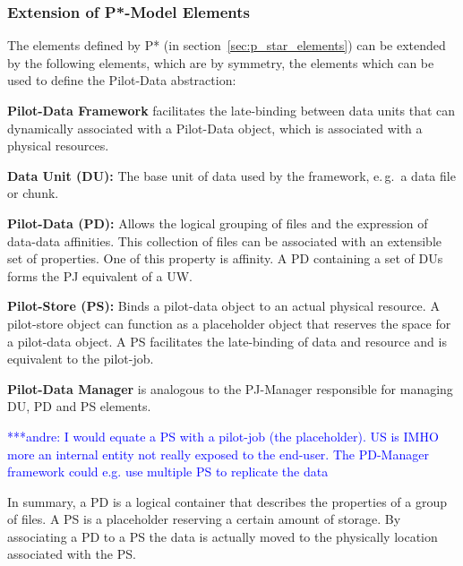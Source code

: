 \documentclass[conference,final]{IEEEtran}
\newcommand{\jhanote}[1]{ {\textcolor{red} { ***shantenu: #1 }}}
\newcommand{\alnote}[1]{ {\textcolor{blue} { ***andre: #1 }}}
\newcommand{\alnote}[1]{}
\newcommand{\jhanote}[1]{}
\begin{document}
\subsubsection*{Extension of P*-Model Elements}

The elements defined by P* (in section~\ref{sec:p_star_elements}) can be
extended by the following elements, which are by symmetry, the
elements which can be used to define the Pilot-Data abstraction:
\begin{compactenum}[A.]
\item \textbf{Pilot-Data Framework} facilitates the late-binding between data 
 units that can dynamically associated with a Pilot-Data object, which is 
 associated with a physical resources. 
\item \textbf{Data Unit (DU):} The base unit of data used by the framework,
  e.\,g.\ a data file or chunk. 
\item \textbf{Pilot-Data (PD):} Allows the logical grouping of files
  and the expression of data-data affinities. This collection of files
  can be associated with an extensible set of properties. One of this
  property is affinity. A PD containing a set of DUs forms the PJ
  equivalent of a UW.
\item \textbf{Pilot-Store (PS):} Binds a pilot-data object to an actual
  physical resource. A pilot-store object can function as a
  placeholder object that reserves the space for a pilot-data object. A PS  
  facilitates the late-binding of data and resource and is equivalent to the 
  pilot-job.
\item \textbf{Pilot-Data Manager} is analogous to the PJ-Manager responsible for 
  managing DU, PD and PS elements. 
\end{compactenum}

\alnote{I would equate a PS with a pilot-job (the placeholder). US is
  IMHO more an internal entity not really exposed to the end-user. The
  PD-Manager framework could e.g. use multiple PS to replicate the
  data}

In summary, a PD is a logical container that describes the properties of a group
of files. A PS is a placeholder reserving a certain amount of storage. By
associating a PD to a PS the data is actually moved to the physically location
associated with the PS.  
\end{document}
